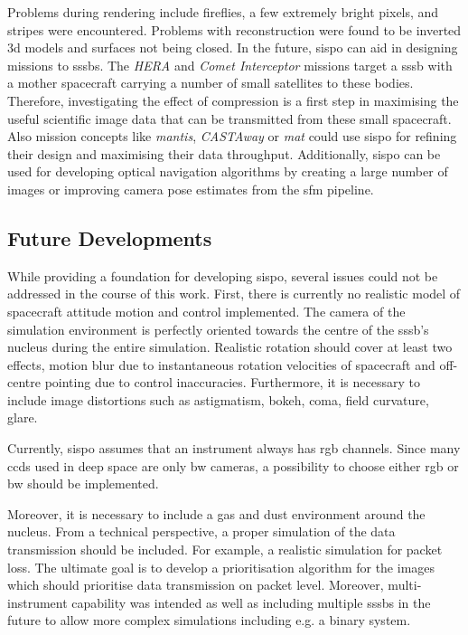Problems during rendering include fireflies, a few extremely bright pixels, and stripes were encountered.
Problems with reconstruction were found to be inverted \gls{3d} models and surfaces not being closed.
In the future, \gls{sispo} can aid in designing missions to \glspl{sssb}. The \textit{HERA} and \textit{Comet Interceptor} missions target a \gls{sssb} with a mother spacecraft carrying a number of small satellites to these bodies. Therefore, investigating the effect of compression is a first step in maximising the useful scientific image data that can be transmitted from these small spacecraft. Also mission concepts like \textit{\gls{mantis}}, \textit{CASTAway} or \textit{\gls{mat}} could use \gls{sispo} for refining their design and maximising their data throughput. Additionally, \gls{sispo} can be used for developing optical navigation algorithms by creating a large number of images or improving camera pose estimates from the \gls{sfm} pipeline.

\subsection{Future Developments}
While providing a foundation for developing \gls{sispo}, several issues could not be addressed in the course of this work.
First, there is currently no realistic model of spacecraft attitude motion and control implemented. The camera of the simulation environment is perfectly oriented towards the centre of the \gls{sssb}'s nucleus during the entire simulation. Realistic rotation should cover at least two effects, motion blur due to instantaneous rotation velocities of spacecraft and off-centre pointing due to control inaccuracies. Furthermore, it is necessary to include  image distortions such as astigmatism, bokeh, coma, field curvature, glare.

Currently, \gls{sispo} assumes that an instrument always has \gls{rgb} channels. Since many \gls{ccd}s used in deep space are only \gls{bw} cameras, a possibility to choose either \gls{rgb} or \gls{bw} should be implemented.

Moreover, it is necessary to include a gas and dust environment around the nucleus. From a technical perspective, a proper simulation of the data transmission should be included. For example, a realistic simulation for packet loss. The ultimate goal is to develop a prioritisation algorithm for the images which should prioritise data transmission on packet level.
Moreover, multi-instrument capability was intended as well as including multiple \gls{sssb}s in the future to allow more complex simulations including e.g. a binary system.


